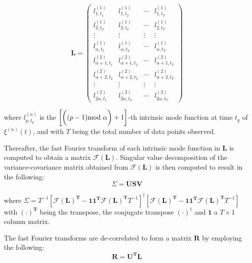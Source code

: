 \documentclass[onecolumn, groupedaddress, 10pt]{revtex4-1}
\begin{document}
\begin{equation}
\mathbf{L} = \left( \begin{array}{cccc}
l_{1,t_1}^{(1)} & l_{1,t_2}^{(1)} & \cdots & l_{1,t_T}^{(1)} \\
l_{2,t_2}^{(1)} & l_{2,t_2}^{(1)} & \cdots & l_{2,t_T}^{(1)} \\
\vdots & \vdots & \vdots & \vdots \\
l_{\alpha,t_1}^{(1)} & l_{\alpha ,t_2}^{(1)} & \cdots & l_{\alpha,t_T}^{(1)} \\
l_{\alpha+1,t_1}^{(2)} & l_{\alpha+1,t_2}^{(2)} & \cdots & l_{\alpha+1,t_T}^{(2)} \\
l_{\alpha+2,t_2}^{(2)} & l_{\alpha+2,t_2}^{(2)} & \cdots & l_{\alpha+2,t_T}^{(2)} \\
\vdots & \vdots & \vdots & \vdots \\
l_{2\alpha,t_1}^{(2)} & l_{2\alpha,t_2}^{(2)} & \cdots & l_{2\alpha,t_T}^{(2)}
\end{array} \right)
\end{equation}

where $l_{p,t_q}^{(n)}$ is the $\left[ \bigg( (p-1) \textnormal{mod } \alpha \bigg) + 1\right]$-th intrinsic mode function at time $t_q$ of $\xi^{(n)}(t)$, and with $T$ being the total number of data points observed.

Thereafter, the fast Fourier transform of each intrinsic mode function in $\mathbf{L}$ is computed to obtain a matrix $\mathcal{F} \left( \mathbf{L} \right)$. Singular value decomposition of the variance-covariance matrix obtained from $\mathcal{F}{ \left( \mathbf{L} \right) }$ is then computed to result in the following:
\begin{equation}
\Sigma = \mathbf{USV}
\end{equation}
 
where $\Sigma = T^{-1} \left[ \mathcal{F}(\mathbf{L}) ^{\mathbf{T}} - \mathbf{1}\mathbf{1}^{\mathbf{T}} \mathcal{F}(\mathbf{L})^{\mathbf{T}} T^{-1} \right]^{ \dagger } \left[ \mathcal{F}(\mathbf{L})^{\mathbf{T}} - \mathbf{1}\mathbf{1}^{\mathbf{T}} \mathcal{F}( \mathbf{L})^{\mathbf{T}} T^{-1} \right] $with $(\cdot)^\mathbf{T}$ being the transpose, the conjugate transpose $(\cdot)^\dagger$ and $\mathbf{1}$ a $T \times 1$ column matrix.


The fast Fourier transforms are de-correlated to form a matrix $\mathbf{R}$ by employing the following:
\begin{equation}
\mathbf{R} = \mathbf{U}^{\mathbf{T}}\mathbf{L}
\end{equation}
\end{document}
